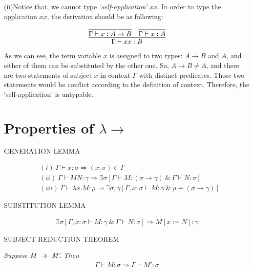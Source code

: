 (ii)Notice that, we cannot type \textit{`self-application'} $xx$. In order to type the application $xx$, the derivation should be as following:

$$
\infer{\Gamma \vdash xx:B}{
    \infer{\Gamma \vdash x:A \rightarrow B}{} 
    &
    \infer{\Gamma \vdash x:A}{}
}
$$


As we can see, the term variable $x$ is assigned to two types: $A \rightarrow B$ and $A$, and either of them can be substituted by the other one. So, $A \rightarrow B \neq A$, and there are two statements of subject $x$ in context $\Gamma$ with distinct predicates. Those two statements would be conflict according to the definition of context. Therefore, the `self-application' is untypable. 


\section{Properties of $\lambda \rightarrow $}

\begin{lemma}
\normalfont GENERATION LEMMA
\end{lemma}
\begin{align*}
  &(i)\ \Gamma \vdash x:\sigma \Rightarrow (x:\sigma)\in \Gamma \\
  &(ii)\ \Gamma \vdash MN:\gamma \Rightarrow \exists \sigma[\Gamma \vdash M:(\sigma \rightarrow \gamma)\ \& \ \Gamma \vdash N:\sigma]\\
  &(iii)\ \Gamma \vdash \lambda x.M:\rho \Rightarrow \exists \sigma ,\gamma[\Gamma ,x:\sigma \vdash M:\gamma\ \& \ \rho \equiv (\sigma \rightarrow \gamma)] 
\end{align*}


\begin{lemma}
\normalfont SUBSTITUTION LEMMA
\end{lemma}
\begin{align*}
   \exists \sigma[\Gamma,x:\sigma \vdash M:\gamma \ \& \ \Gamma \vdash N:\sigma]\Rightarrow M[x:=N]:\gamma
\end{align*}


\begin{theorem}
\normalfont \textsc{SUBJECT REDUCTION THEOREM}
\end{theorem}

\textit{Suppose M $\twoheadrightarrow$ M'. Then} 
\begin{align*}
   \Gamma \vdash M:\sigma \Rightarrow \Gamma \vdash M':\sigma
\end{align*}

